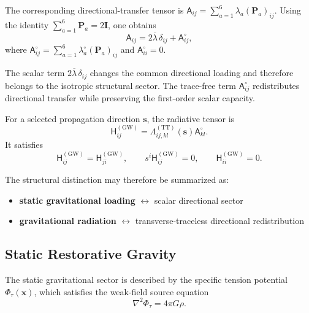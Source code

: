 The corresponding directional-transfer tensor is $\mathsf{A}_{ij} = \sum_{a=1}^{6} \lambda_{a} (\mathbf{P}_{a})_{ij}$. Using the identity $\sum_{a=1}^{6} \mathbf{P}_{a} = 2\mathbf{I}$, one obtains
\begin{equation}
    \mathsf{A}_{ij} = 2\overline{\lambda}\,\delta_{ij} + \mathsf{A}_{ij}^{\circ},
    \label{eq:n12_directional_decomposition}
\end{equation}
where $\mathsf{A}_{ij}^{\circ} = \sum_{a=1}^{6} \lambda_{a}^{\circ} (\mathbf{P}_{a})_{ij}$ and $\mathsf{A}_{ii}^{\circ} = 0$.

The scalar term $2\overline{\lambda}\,\delta_{ij}$ changes the common directional loading and therefore belongs to the isotropic structural sector. The trace-free term $\mathsf{A}_{ij}^{\circ}$ redistributes directional transfer while preserving the first-order scalar capacity.

For a selected propagation direction $\mathbf{s}$, the radiative tensor is
\begin{equation}
    \mathsf{H}_{ij}^{(\mathrm{GW})} = \Lambda_{ij,kl}^{(\mathrm{TT})}(\mathbf{s}) \mathsf{A}_{kl}^{\circ}.
    \label{eq:n12_radiative_projection}
\end{equation}
It satisfies
\begin{equation}
    \mathsf{H}_{ij}^{(\mathrm{GW})} = \mathsf{H}_{ji}^{(\mathrm{GW})}, \qquad s^{i} \mathsf{H}_{ij}^{(\mathrm{GW})} = 0, \qquad \mathsf{H}_{ii}^{(\mathrm{GW})} = 0.
\end{equation}

The structural distinction may therefore be summarized as:
\begin{itemize}
    \item \textbf{static gravitational loading} $\longleftrightarrow$ scalar directional sector
    \item \textbf{gravitational radiation} $\longleftrightarrow$ transverse-traceless directional redistribution
\end{itemize}

\subsection{Static Restorative Gravity}
\label{subsec:n12_static_gravity}

The static gravitational sector is described by the specific tension potential $\Phi_{\tau}(\mathbf{x})$, which satisfies the weak-field source equation
\begin{equation}
    \nabla^{2}\Phi_{\tau} = 4\pi G\rho.
    \label{eq:n12_static_poisson}
\end{equation}

